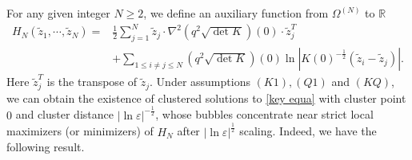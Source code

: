 \documentclass[12pt,reqno]{amsart}
\numberwithin{equation}{section}
\theoremstyle{definition}
\theoremstyle{remark}
\begin{document}
For any given integer $ N\geq 2 $, we define an auxiliary function from $ \Omega^{(N)} $ to $ \mathbb{R} $
\begin{equation}\label{def of H_N}
\begin{split}
H_N(\tilde{z}_1,\cdots, \tilde{z}_N)=&\frac{1}{2}\sum_{j=1}^N\tilde{z}_j\cdot \nabla^2\left(q^2\sqrt{\det K} \right)(0 )\cdot\tilde{z}_j^T\\
&+\sum_{1\leq i\neq j\leq N}\left( q^2  \sqrt{\det K}\right)(0)\ln| K(0)^{-\frac{1}{2}}\left( \tilde{z}_i - \tilde{z}_j\right)  |.
\end{split}
\end{equation}
Here $ \tilde{z}_j^T $ is the transpose of $ \tilde{z}_j $.
Under  assumptions $ (K1),(Q1)$  and  $(KQ) $, we can obtain the existence of clustered solutions to \eqref{key equa} with cluster point $ 0 $ and cluster distance $ |\ln\varepsilon|^{-\frac{1}{2}} $, whose bubbles concentrate near strict local maximizers (or minimizers) of $ H_N $ after $ |\ln\varepsilon|^{\frac{1}{2}} $ scaling. Indeed, we have the following result.%
\end{document}
